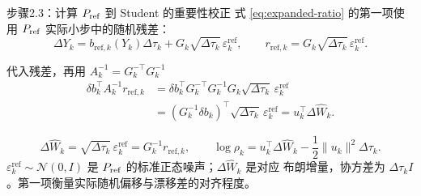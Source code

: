 \documentclass[10pt,aspectratio=169]{beamer}
\newcommand{\N}{\mathcal N}
\begin{document}
\begin{frame}{步骤2.3：计算 \ensuremath{P_{\rm ref}} 到 Student 的重要性校正}
\small
式 \eqref{eq:expanded-ratio} 的第一项使用 \ensuremath{P_{\rm ref}} 实际小步中的随机残差：
\begin{equation}
\Delta Y_k=b_{\mathrm{ref},k}(Y_k)\Delta\tau_k
+G_k\sqrt{\Delta\tau_k}\,\varepsilon_k^\mathrm{ref},\qquad
r_{\mathrm{ref},k}=G_k\sqrt{\Delta\tau_k}\,\varepsilon_k^\mathrm{ref}.
\end{equation}
\begin{block}{代入残差，再用 $A_k^{-1}=G_k^{-\top}G_k^{-1}$}
\begin{equation}
\begin{aligned}
\delta b_k^\top A_k^{-1}r_{\mathrm{ref},k}
&=\delta b_k^\top G_k^{-\top}G_k^{-1}G_k
\sqrt{\Delta\tau_k}\,\varepsilon_k^\mathrm{ref}\\
&=(G_k^{-1}\delta b_k)^\top\sqrt{\Delta\tau_k}\,\varepsilon_k^\mathrm{ref}
=u_k^\top\Delta\widehat W_k.
\end{aligned}
\end{equation}
\end{block}
\begin{equation}
\Delta\widehat W_k=\sqrt{\Delta\tau_k}\,\varepsilon_k^\mathrm{ref}
=G_k^{-1}r_{\mathrm{ref},k},\qquad
\boxed{\log\rho_k=u_k^\top\Delta\widehat W_k
-\frac12\|u_k\|^2\Delta\tau_k.}
\end{equation}
$\varepsilon_k^\mathrm{ref}\sim\N(0,I)$ 是 \ensuremath{P_{\rm ref}} 的标准正态噪声；$\Delta\widehat W_k$ 是对应 布朗增量，协方差为 $\Delta\tau_k I$。第一项衡量实际随机偏移与漂移差的对齐程度。
\end{frame}
\end{document}
